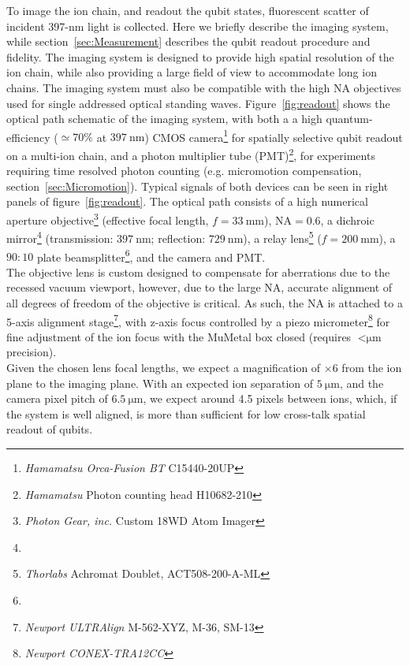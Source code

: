     To image the ion chain, and readout the qubit states, fluorescent scatter of incident 397-nm light is collected. Here we briefly describe the imaging system, while section~\ref{sec:Measurement} describes the qubit readout procedure and fidelity. The imaging system is designed to provide high spatial resolution of the ion chain, while also providing a large field of view to accommodate long ion chains. The imaging system must also be compatible with the high NA objectives used for single addressed optical standing waves.
    Figure~\ref{fig:readout} shows the optical path schematic of the imaging system, with both a
    a high quantum-efficiency ($\simeq 70\%$ at $397~\unit{\nano\meter}$) 
    CMOS camera\footnote{\emph{Hamamatsu Orca-Fusion
    BT} C15440-20UP} for spatially selective qubit readout on a multi-ion chain, and 
    a photon multiplier tube (PMT)\footnote{\emph{Hamamatsu} Photon counting head H10682-210}, for experiments requiring time resolved photon counting (e.g. micromotion compensation, section~\ref{sec:Micromotion}).
    Typical signals of both devices can be seen in right panels of figure~\ref{fig:readout}. 
    The optical path consists of a high numerical aperture objective\footnote{\emph{Photon Gear, inc.} Custom 18WD Atom Imager} (effective focal length, $f=33~\unit{\milli\meter}$), $\mathrm{NA}=0.6$, a dichroic mirror\footnote{} (transmission: $397~\unit{\nano\meter}$; reflection: $729~\unit{\nano\meter}$), a relay lens\footnote{\emph{Thorlabs} Achromat Doublet, ACT508-200-A-ML} ($f=200~\unit{\milli\meter}$), a $90:10$ plate beamsplitter\footnote{}, and the camera and PMT. \\
    The objective lens is custom designed to compensate for aberrations due to the recessed vacuum viewport, however, due to the large NA, accurate alignment of all degrees of freedom of the objective is critical. As such, the NA is attached to a 5-axis alignment stage\footnote{\emph{Newport ULTRAlign} M-562-XYZ, M-36, SM-13}, with z-axis focus controlled by a piezo micrometer\footnote{\emph{Newport CONEX-TRA12CC}} for fine adjustment of the ion focus with the MuMetal box closed (requires $<\unit{\micro\meter}$ precision).\\
    Given the chosen lens focal lengths, we expect a magnification of $\times 6$ from the ion plane to the imaging plane. With an expected ion separation of $5~\unit{\micro\meter}$, and the camera pixel pitch of $6.5~\unit{\micro\meter}$, we expect around 4.5 pixels between ions, which, if the system is well aligned, is more than sufficient for low cross-talk spatial readout of qubits.
    
